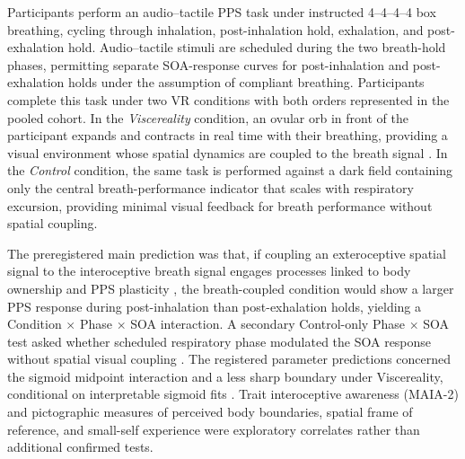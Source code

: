 Participants perform an audio--tactile PPS task \citep{canzoneri2012dynamic, teneggi2013social} under instructed 4--4--4--4 box breathing, cycling through inhalation, post-inhalation hold, exhalation, and post-exhalation hold. Audio--tactile stimuli are scheduled during the two breath-hold phases, permitting separate SOA-response curves for post-inhalation and post-exhalation holds under the assumption of compliant breathing. Participants complete this task under two VR conditions with both orders represented in the pooled cohort. In the \emph{Viscereality} condition, an ovular orb in front of the participant expands and contracts in real time with their breathing, providing a visual environment whose spatial dynamics are coupled to the breath signal \citep{Goral2024}. In the \emph{Control} condition, the same task is performed against a dark field containing only the central breath-performance indicator that scales with respiratory excursion, providing minimal visual feedback for breath performance without spatial coupling.

The preregistered main prediction was that, if coupling an exteroceptive spatial signal to the interoceptive breath signal engages processes linked to body ownership and PPS plasticity \citep{samad_2015, chancel_2021, Ardizzi2018}, the breath-coupled condition would show a larger PPS response during post-inhalation than post-exhalation holds, yielding a Condition $\times$ Phase $\times$ SOA interaction. A secondary Control-only Phase $\times$ SOA test asked whether scheduled respiratory phase modulated the SOA response without spatial visual coupling \citep{saltafossi_2025, kluger_2021, grund_2021}. The registered parameter predictions concerned the sigmoid midpoint interaction and a less sharp boundary under Viscereality, conditional on interpretable sigmoid fits \citep{Chiarella2024, hanley_2020, hruby_2024, nguyen_2020}. Trait interoceptive awareness (MAIA-2) and pictographic measures of perceived body boundaries, spatial frame of reference, and small-self experience were exploratory correlates rather than additional confirmed tests.
